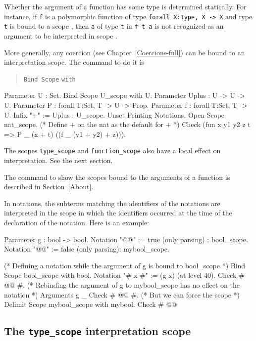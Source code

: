 Whether the argument of a function has some type {\type} is determined
statically. For instance, if {\tt f} is a polymorphic function of type
{\tt forall X:Type, X -> X} and type {\tt t} is bound to a scope
{\scope}, then {\tt a} of type {\tt t} in {\tt f~t~a} is not
recognized as an argument to be interpreted in scope {\scope}.

\label{bindscope}
More generally, any coercion {\class} (see Chapter~\ref{Coercions-full}) can be
bound to an interpretation scope. The command to do it is
\begin{quote}
{\tt Bind Scope} {\scope} \texttt{with} {\class}
\end{quote}

\Example
\begin{coq_example}
Parameter U : Set.
Bind Scope U_scope with U.
Parameter Uplus : U -> U -> U.
Parameter P : forall T:Set, T -> U -> Prop.
Parameter f : forall T:Set, T -> U.
Infix "+" := Uplus : U_scope.
Unset Printing Notations.
Open Scope nat_scope. (* Define + on the nat as the default for + *)
Check (fun x y1 y2 z t => P _ (x + t) ((f _ (y1 + y2) + z))).
\end{coq_example}

\Rem The scopes {\tt type\_scope} and {\tt function\_scope} also have a local effect on
interpretation. See the next section.

\SeeAlso The command to show the scopes bound to the arguments of a
function is described in Section~\ref{About}.

\Rem In notations, the subterms matching the identifiers of the
notations are interpreted in the scope in which the identifiers
occurred at the time of the declaration of the notation. Here is an
example:

\begin{coq_example}
Parameter g : bool -> bool.
Notation "@@" := true (only parsing) : bool_scope.
Notation "@@" := false (only parsing): mybool_scope.

(* Defining a notation while the argument of g is bound to bool_scope *)
Bind Scope bool_scope with bool.
Notation "# x #" := (g x) (at level 40).
Check # @@ #.
(* Rebinding the argument of g to mybool_scope has no effect on the notation *)
Arguments g _%
Check # @@ #.
(* But we can force the scope *)
Delimit Scope mybool_scope with mybool.
Check # @@%
\end{coq_example}

\subsection[The {\tt type\_scope} interpretation scope]{The {\tt type\_scope} interpretation scope}

